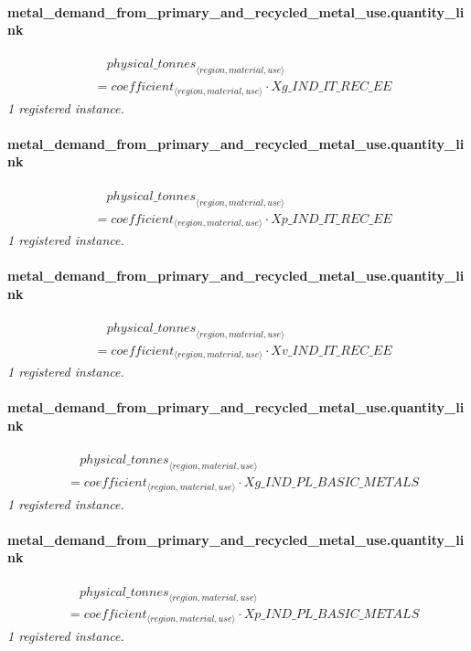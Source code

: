 \documentclass[11pt]{article}
\begin{document}
\paragraph{metal\_demand\_from\_primary\_and\_recycled\_metal\_use.quantity\_link}
\begin{align*}
&\quad {physical\_tonnes}_{\langle region, material, use\rangle}\\
&= coefficient_{\langle region, material, use\rangle} \cdot Xg\_IND\_IT\_REC\_EE
\end{align*}
\noindent\emph{1 registered instance.}\par
\paragraph{metal\_demand\_from\_primary\_and\_recycled\_metal\_use.quantity\_link}
\begin{align*}
&\quad {physical\_tonnes}_{\langle region, material, use\rangle}\\
&= coefficient_{\langle region, material, use\rangle} \cdot Xp\_IND\_IT\_REC\_EE
\end{align*}
\noindent\emph{1 registered instance.}\par
\paragraph{metal\_demand\_from\_primary\_and\_recycled\_metal\_use.quantity\_link}
\begin{align*}
&\quad {physical\_tonnes}_{\langle region, material, use\rangle}\\
&= coefficient_{\langle region, material, use\rangle} \cdot Xv\_IND\_IT\_REC\_EE
\end{align*}
\noindent\emph{1 registered instance.}\par
\paragraph{metal\_demand\_from\_primary\_and\_recycled\_metal\_use.quantity\_link}
\begin{align*}
&\quad {physical\_tonnes}_{\langle region, material, use\rangle}\\
&= coefficient_{\langle region, material, use\rangle} \cdot Xg\_IND\_PL\_BASIC\_METALS
\end{align*}
\noindent\emph{1 registered instance.}\par
\paragraph{metal\_demand\_from\_primary\_and\_recycled\_metal\_use.quantity\_link}
\begin{align*}
&\quad {physical\_tonnes}_{\langle region, material, use\rangle}\\
&= coefficient_{\langle region, material, use\rangle} \cdot Xp\_IND\_PL\_BASIC\_METALS
\end{align*}
\noindent\emph{1 registered instance.}\par
\end{document}
